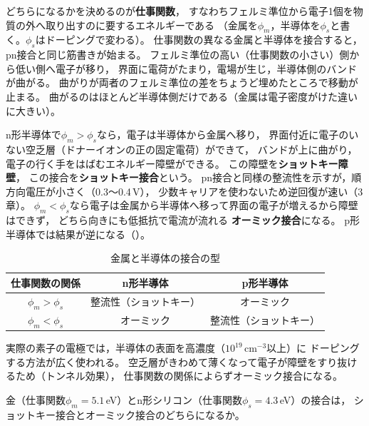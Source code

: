 どちらになるかを決めるのが\textbf{仕事関数}，
すなわちフェルミ準位から電子1個を物質の外へ取り出すのに要するエネルギーである
（金属を$\phi_m$，半導体を$\phi_s$と書く。$\phi_s$はドーピングで変わる）。
仕事関数の異なる金属と半導体を接合すると，pn接合と同じ筋書きが始まる。
フェルミ準位の高い（仕事関数の小さい）側から低い側へ電子が移り，
界面に電荷がたまり，電場が生じ，半導体側のバンドが曲がる。
曲がりが両者のフェルミ準位の差をちょうど埋めたところで移動が止まる。
曲がるのはほとんど半導体側だけである（金属は電子密度がけた違いに大きい）。

n形半導体で$\phi_m > \phi_s$なら，電子は半導体から金属へ移り，
界面付近に電子のいない空乏層（ドナーイオンの正の固定電荷）ができて，
バンドが上に曲がり，電子の行く手をはばむエネルギー障壁ができる。
この障壁を\textbf{ショットキー障壁}，
この接合を\textbf{ショットキー接合}という。
pn接合と同様の整流性を示すが，順方向電圧が小さく（0.3〜0.4\,V），
少数キャリアを使わないため逆回復が速い（3章）。
$\phi_m < \phi_s$なら電子は金属から半導体へ移って界面の電子が増えるから障壁はできず，
どちら向きにも低抵抗で電流が流れる
\textbf{オーミック接合}になる。
p形半導体では結果が逆になる（）。

\begin{table}[ht]
\begin{center}
\caption{金属と半導体の接合の型}
\label{tab2.1}
\begin{tabular}{c|c|c}
\hline
仕事関数の関係 & n形半導体 & p形半導体 \\
\hline
$\phi_m > \phi_s$ & 整流性（ショットキー） & オーミック \\
$\phi_m < \phi_s$ & オーミック & 整流性（ショットキー） \\
\hline
\end{tabular}
\end{center}
\end{table}

実際の素子の電極では，半導体の表面を高濃度（$10^{19}\,\mathrm{cm^{-3}}$以上）に
ドーピングする方法が広く使われる。
空乏層がきわめて薄くなって電子が障壁をすり抜けるため（トンネル効果），
仕事関数の関係によらずオーミック接合になる。

\begin{問}
\item 金（仕事関数$\phi_m = 5.1$\,eV）とn形シリコン（仕事関数$\phi_s = 4.3$\,eV）の接合は，
ショットキー接合とオーミック接合のどちらになるか。
\end{問}

